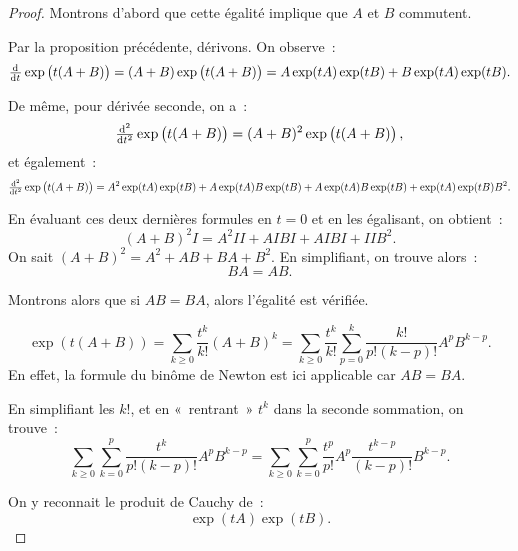 \documentclass{report}
\theoremstyle{definition}
\theoremstyle{remark}
\numberwithin{equation}{section}
\begin{document}
			\begin{proof} Montrons d'abord que cette égalité implique que $A$ et $B$ commutent.

			Par la proposition précédente, dérivons. On observe~:
			\begin{equation}
				\od {}t\exp\left(t(A+B)\right) = (A+B)\exp\left(t(A+B)\right) = A\exp(tA)\exp(tB) + B\exp(tA)\exp(tB).
			\end{equation}

			De même, pour dérivée seconde, on a~:
			\begin{equation}
				\od[2]{}t \exp\left(t(A+B)\right) = (A+B)^2\exp\left(t(A+B)\right),
			\end{equation}
			et également~:
			\begin{equation}
				\od[2]{}t \exp\left(t(A+B)\right) = A^2\exp(tA)\exp(tB) + A\exp(tA)B\exp(tB) + A\exp(tA)B\exp(tB) + \exp(tA)\exp(tB)B^2.
			\end{equation}

			En évaluant ces deux dernières formules en $t=0$ et en les égalisant, on obtient~:
			\begin{equation}
				(A+B)^2I = A^2II + AIBI + AIBI + IIB^2.
			\end{equation}
			On sait $(A+B)^2 = A^2 + AB + BA + B^2$. En simplifiant, on trouve alors~:
			\begin{equation}
				BA = AB.
			\end{equation}

			Montrons alors que si $AB=BA$, alors l'égalité est vérifiée.

			\begin{equation}
				\exp\left(t(A+B)\right) = \sum_{k \geq 0}\frac {t^k}{k!}(A+B)^k = \sum_{k \geq 0}\frac {t^k}{k!}\sum_{p=0}^k\frac {k!}{p!(k-p)!}A^pB^{k-p}.
			\end{equation}
			En effet, la formule du binôme de Newton est ici applicable car $AB = BA$.

			En simplifiant les $k!$, et en «~rentrant~» $t^k$ dans la seconde sommation, on trouve~:
			\begin{equation}
				\sum_{k \geq 0}\sum_{k=0}^p\frac {t^k}{p!(k-p)!}A^pB^{k-p} = \sum_{k \geq 0}\sum_{k=0}^p\frac {t^p}{p!}A^p\frac {t^{k-p}}{(k-p)!}B^{k-p}.
			\end{equation}

			On y reconnait le produit de Cauchy de~:
			\begin{equation}
				\exp(tA)\exp(tB).
			\end{equation}
			\end{proof}
\end{document}
